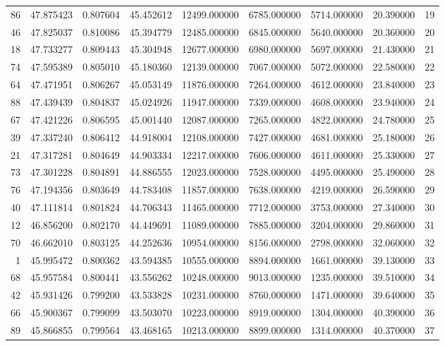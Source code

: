 \begin{tabular}{rrrrrrrrr}
86 & 47.875423 & 0.807604 & 45.452612 & 12499.000000 & 6785.000000 & 5714.000000 & 20.390000 & 19 \\
46 & 47.825037 & 0.810086 & 45.394779 & 12485.000000 & 6845.000000 & 5640.000000 & 20.360000 & 20 \\
18 & 47.733277 & 0.809443 & 45.304948 & 12677.000000 & 6980.000000 & 5697.000000 & 21.430000 & 21 \\
74 & 47.595389 & 0.805010 & 45.180360 & 12139.000000 & 7067.000000 & 5072.000000 & 22.580000 & 22 \\
64 & 47.471951 & 0.806267 & 45.053149 & 11876.000000 & 7264.000000 & 4612.000000 & 23.840000 & 23 \\
88 & 47.439439 & 0.804837 & 45.024926 & 11947.000000 & 7339.000000 & 4608.000000 & 23.940000 & 24 \\
67 & 47.421226 & 0.806595 & 45.001440 & 12087.000000 & 7265.000000 & 4822.000000 & 24.780000 & 25 \\
39 & 47.337240 & 0.806412 & 44.918004 & 12108.000000 & 7427.000000 & 4681.000000 & 25.180000 & 26 \\
21 & 47.317281 & 0.804649 & 44.903334 & 12217.000000 & 7606.000000 & 4611.000000 & 25.330000 & 27 \\
73 & 47.301228 & 0.804891 & 44.886555 & 12023.000000 & 7528.000000 & 4495.000000 & 25.490000 & 28 \\
76 & 47.194356 & 0.803649 & 44.783408 & 11857.000000 & 7638.000000 & 4219.000000 & 26.590000 & 29 \\
40 & 47.111814 & 0.801824 & 44.706343 & 11465.000000 & 7712.000000 & 3753.000000 & 27.340000 & 30 \\
12 & 46.856200 & 0.802170 & 44.449691 & 11089.000000 & 7885.000000 & 3204.000000 & 29.860000 & 31 \\
70 & 46.662010 & 0.803125 & 44.252636 & 10954.000000 & 8156.000000 & 2798.000000 & 32.060000 & 32 \\
1 & 45.995472 & 0.800362 & 43.594385 & 10555.000000 & 8894.000000 & 1661.000000 & 39.130000 & 33 \\
68 & 45.957584 & 0.800441 & 43.556262 & 10248.000000 & 9013.000000 & 1235.000000 & 39.510000 & 34 \\
42 & 45.931426 & 0.799200 & 43.533828 & 10231.000000 & 8760.000000 & 1471.000000 & 39.640000 & 35 \\
66 & 45.900367 & 0.799099 & 43.503070 & 10223.000000 & 8919.000000 & 1304.000000 & 40.390000 & 36 \\
89 & 45.866855 & 0.799564 & 43.468165 & 10213.000000 & 8899.000000 & 1314.000000 & 40.370000 & 37 \\

\end{tabular}
